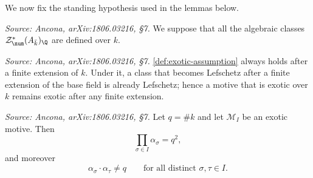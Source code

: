 We now fix the standing hypothesis used in the lemmas below.

\begin{definition}
  \label{def:exotic-assumption}
  \textit{Source: Ancona, arXiv:1806.03216, §7.}
  We suppose that all the algebraic classes
  \(\mathcal{Z}^*_\num(A_{\bar k})_\Q\) are defined over \(k\).
\end{definition}

\begin{remark}
  \label{rem:exotic-assumption-lef}
  \textit{Source: Ancona, arXiv:1806.03216, §7.}
  \cref{def:exotic-assumption} always holds after a finite extension of \(k\).
  Under it, a class that becomes Lefschetz after a finite extension of the base
  field is already Lefschetz; hence a motive that is exotic over \(k\) remains
  exotic after any finite extension.
\end{remark}

\begin{lemma}
  \label{lem:exotic-frobenius}
  \textit{Source: Ancona, arXiv:1806.03216, §7.}
  Let \(q = \#k\) and let \(\mathcal{M}_I\) be an exotic motive. Then
  \[\prod_{\sigma \in I} \alpha_\sigma = q^2,\]
  and moreover
  \[\alpha_\sigma \cdot \alpha_\tau \neq q
    \qquad \text{for all distinct } \sigma, \tau \in I.\]
\end{lemma}

